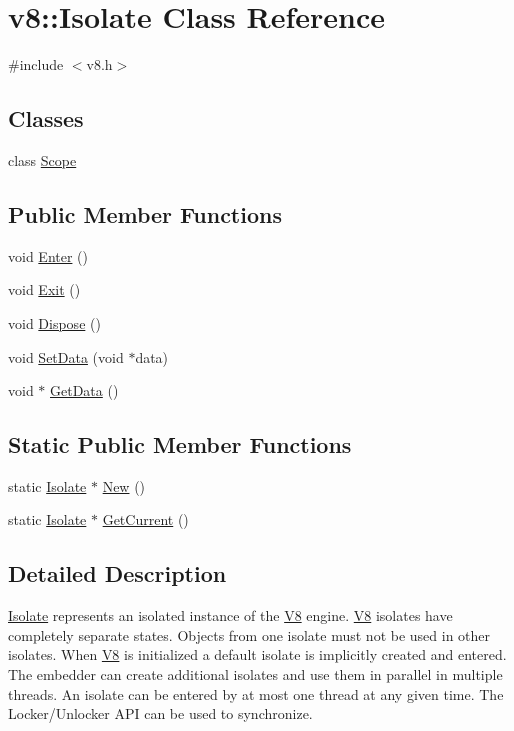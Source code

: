 \hypertarget{classv8_1_1_isolate}{}\section{v8\+:\+:Isolate Class Reference}
\label{classv8_1_1_isolate}


{\ttfamily \#include $<$v8.\+h$>$}

\subsection*{Classes}
\begin{DoxyCompactItemize}
\item 
class \hyperlink{classv8_1_1_isolate_1_1_scope}{Scope}
\end{DoxyCompactItemize}
\subsection*{Public Member Functions}
\begin{DoxyCompactItemize}
\item 
void \hyperlink{classv8_1_1_isolate_aec80bb49b6b7647ff75e8f2cc9484ea3}{Enter} ()
\item 
void \hyperlink{classv8_1_1_isolate_a64a8503cafd00d1d2cadfbb0c2345054}{Exit} ()
\item 
void \hyperlink{classv8_1_1_isolate_a1a5a5762e4221aff8c6b10f9e3cec0af}{Dispose} ()
\item 
void \hyperlink{classv8_1_1_isolate_a57e22868fac4e090f05d23e432e2c771}{Set\+Data} (void $\ast$data)
\item 
void $\ast$ \hyperlink{classv8_1_1_isolate_a6c2de5865a62fe9a7de9e7e1c334cc6e}{Get\+Data} ()
\end{DoxyCompactItemize}
\subsection*{Static Public Member Functions}
\begin{DoxyCompactItemize}
\item 
static \hyperlink{classv8_1_1_isolate}{Isolate} $\ast$ \hyperlink{classv8_1_1_isolate_a36f397e1d09e0122e89641288f348d2d}{New} ()
\item 
static \hyperlink{classv8_1_1_isolate}{Isolate} $\ast$ \hyperlink{classv8_1_1_isolate_aa79441b5da4438221d0f38790c4de2ed}{Get\+Current} ()
\end{DoxyCompactItemize}


\subsection{Detailed Description}
\hyperlink{classv8_1_1_isolate}{Isolate} represents an isolated instance of the \hyperlink{classv8_1_1_v8}{V8} engine. \hyperlink{classv8_1_1_v8}{V8} isolates have completely separate states. Objects from one isolate must not be used in other isolates. When \hyperlink{classv8_1_1_v8}{V8} is initialized a default isolate is implicitly created and entered. The embedder can create additional isolates and use them in parallel in multiple threads. An isolate can be entered by at most one thread at any given time. The Locker/\+Unlocker A\+P\+I can be used to synchronize. 

